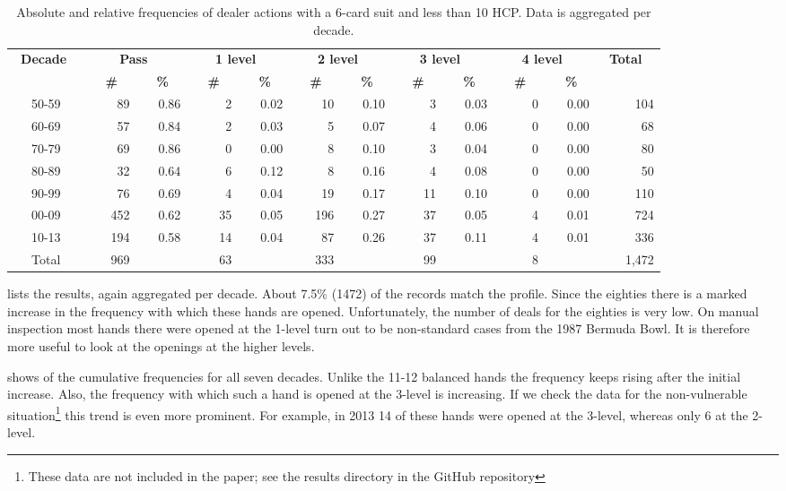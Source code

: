 \documentclass{llncs}
\begin{document}
\begin{table}
\caption{Absolute and relative frequencies of dealer actions with a
  6-card suit and less than 10 HCP. Data is aggregated per decade.}
\label{tbl:weak-two-1st}
\centering\footnotesize
\begin{tabular}{|c|r|r|r|r|r|r|r|r|r|r|r|}
\hline
\bf \ Decade \ & 
\multicolumn{2}{|c|}{\bf \ Pass \ }  &
\multicolumn{2}{|c|}{\bf \ 1 level \ } &
\multicolumn{2}{|c|}{\bf \ 2 level \ } &
\multicolumn{2}{|c|}{\bf \ 3 level \ } &
\multicolumn{2}{|c|}{\bf \ 4 level \ } &
\bf \ Total \  \\ 
\cline{2-11} &
\bf \ \ \# \ &\bf \ \ \% \ &
\bf \ \ \# \ &\bf \ \ \% \ &
\bf \ \ \# \ &\bf \ \ \% \ &
\bf \ \ \# \ &\bf \ \ \% \ &
\bf \ \ \# \ &\bf \ \ \% \ &
\\ \hline\hline
50-59& 89&0.86&2&0.02&10&0.10&3&0.03&0&0.00&104 \\ \hline
60-69& 57&0.84&2&0.03&5&0.07&4&0.06&0&0.00&68 \\ \hline
70-79& 69&0.86&0&0.00&8&0.10&3&0.04&0&0.00&80 \\ \hline
80-89& 32&0.64&6&0.12&8&0.16&4&0.08&0&0.00&50 \\ \hline
90-99&76&0.69&4&0.04&19&0.17&11&0.10&0&0.00&110\\ \hline
00-09&452&0.62&35&0.05&196&0.27&37&0.05&4&0.01&724 \\ \hline 
10-13&194&0.58&14&0.04&87&0.26&37&0.11&4&0.01& 336  \\ \hline
\hline
Total & 969 && 63 && 333 && 99 && 8 && 1,472 \\ \hline 	
\end{tabular}
\end{table}

 lists the results, again aggregated per
decade.  About 7.5\% (1472) of the records match the profile. Since
the eighties there is a marked increase in the frequency with which these
hands are opened.  Unfortunately, the number of deals for the eighties
is very low. On manual inspection most hands there were opened at the
1-level turn out to be non-standard cases from the 1987 Bermuda
Bowl.  It is therefore more useful to look at the openings at the
higher levels.  


 shows of the cumulative
frequencies for all seven decades.  Unlike the 11-12 balanced hands
the frequency keeps rising after the initial increase.  Also, the
frequency with which such a hand is opened at the 3-level is
increasing. If we check
the data for the non-vulnerable situation\footnote{%
These data are not included in the paper; see the results directory in
the GitHub repository} 
this trend is even more prominent. For example, in 2013 14 of these
hands were opened at the 3-level, whereas only 6 at the 2-level.   
\end{document}

